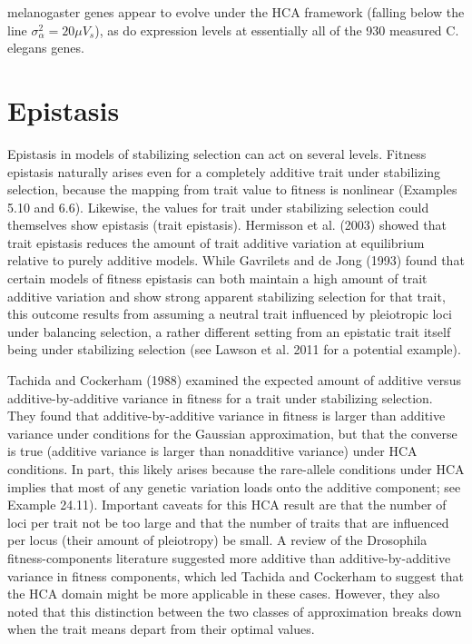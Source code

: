 \documentclass{article}
\begin{document}
melanogaster genes appear to evolve under the HCA framework (falling below the line  $ \sigma_{\alpha}^2 = 20\mu V_s $), as do expression levels at essentially all of the 930 measured C. elegans genes.

\section{Epistasis}
Epistasis in models of stabilizing selection can act on several levels. Fitness epistasis naturally arises even for a completely additive trait under stabilizing selection, because the mapping from trait value to fitness is nonlinear (Examples 5.10 and 6.6). Likewise, the values for trait under stabilizing selection could themselves show epistasis (trait epistasis). Hermisson et al. (2003) showed that trait epistasis reduces the amount of trait additive variation at equilibrium relative to purely additive models. While Gavrilets and de Jong (1993) found that certain models of fitness epistasis can both maintain a high amount of trait additive variation and show strong apparent stabilizing selection for that trait, this outcome results from assuming a neutral trait influenced by pleiotropic loci under balancing selection, a rather different setting from an epistatic trait itself being under stabilizing selection (see Lawson et al. 2011 for a potential example).

Tachida and Cockerham (1988) examined the expected amount of additive versus additive-by-additive variance in fitness for a trait under stabilizing selection. They found that additive-by-additive variance in fitness is larger than additive variance under conditions for the Gaussian approximation, but that the converse is true (additive variance is larger than nonadditive variance) under HCA conditions. In part, this likely arises because the rare-allele conditions under HCA implies that most of any genetic variation loads onto the additive component; see Example 24.11). Important caveats for this HCA result are that the number of loci per trait not be too large and that the number of traits that are influenced per locus (their amount of pleiotropy) be small. A review of the Drosophila fitness-components literature suggested more additive than additive-by-additive variance in fitness components, which led Tachida and Cockerham to suggest that the HCA domain might be more applicable in these cases. However, they also noted that this distinction between the two classes of approximation breaks down when the trait means depart from their optimal values.
\end{document}
